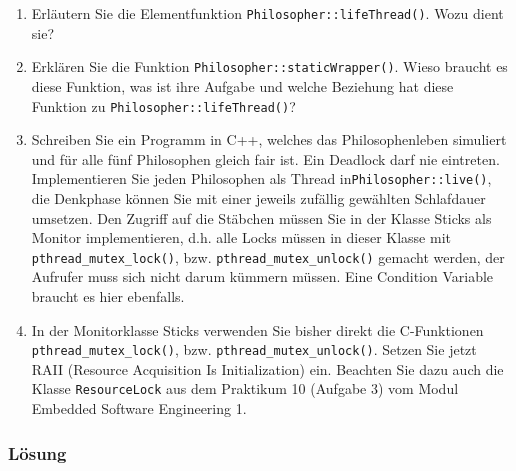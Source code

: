 \begin{enumerate}
  \item Erläutern Sie die Elementfunktion \texttt{Philosopher::lifeThread()}. Wozu dient sie?
  \item Erklären Sie die Funktion \texttt{Philosopher::staticWrapper()}. Wieso braucht es diese Funktion, was ist ihre Aufgabe und welche Beziehung hat diese Funktion zu \texttt{Philosopher::lifeThread()}?
  \item Schreiben Sie ein Programm in C++, welches das Philosophenleben simuliert und für alle fünf Philosophen gleich fair ist. Ein Deadlock darf nie eintreten. Implementieren Sie jeden Philosophen als Thread in\newline\texttt{Philosopher::live()}, die Denkphase können Sie mit einer jeweils zufällig gewählten Schlafdauer umsetzen. Den Zugriff auf die Stäbchen müssen Sie in der Klasse Sticks als Monitor implementieren, d.h. alle Locks müssen in dieser Klasse mit \texttt{pthread\_mutex\_lock()}, bzw. \texttt{pthread\_mutex\_unlock()} gemacht werden, der Aufrufer muss sich nicht darum kümmern müssen. Eine Condition Variable braucht es hier ebenfalls.
  \item In der Monitorklasse Sticks verwenden Sie bisher direkt die C-Funktionen \texttt{pthread\_mutex\_lock()}, bzw. \texttt{pthread\_mutex\_unlock()}. Setzen Sie jetzt RAII (Resource Acquisition Is Initialization) ein. Beachten Sie dazu auch die Klasse \texttt{ResourceLock} aus dem Praktikum 10 (Aufgabe 3) vom Modul Embedded Software Engineering 1.
\end{enumerate}

\subsubsection{Lösung}

